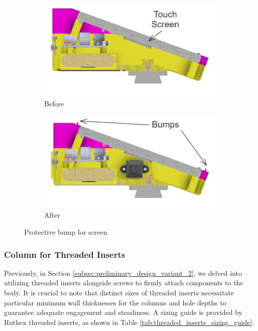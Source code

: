\begin{figure}[!ht]
    \centering
    \begin{subfigure}[c]{0.47\textwidth}
        \begin{minipage}{\textwidth}
            \centering
            \includegraphics[height=3.5 cm]{texs/Part1/chapter4/image/d21.png}
        \end{minipage}
        \caption{Before}
        \label{fig:detail_screen_before}
    \end{subfigure}
    \begin{subfigure}[c]{0.47\textwidth}
        \begin{minipage}{\textwidth}
            \centering
            \includegraphics[height=3.5 cm]{texs/Part1/chapter4/image/d22.png}
        \end{minipage}
        \caption{After}
        \label{fig:detail_screen_after}
    \end{subfigure}
    \caption{Protective bump for screen}
    \label{fig:detail_screen_protect}
\end{figure}

\subsubsection{Column for Threaded Inserts}
Previously, in Section \ref{subsec:preliminary_design_variant_2}, we delved into utilizing threaded inserts alongside screws to firmly attach components to the body. It is crucial to note that distinct sizes of threaded inserts necessitate particular minimum wall thicknesses for the columns and hole depths to guarantee adequate engagement and steadiness. A sizing guide is provided by Ruthex threaded inserts, as shown in Table \ref{tab:threaded_inserts_sizing_guide}.

